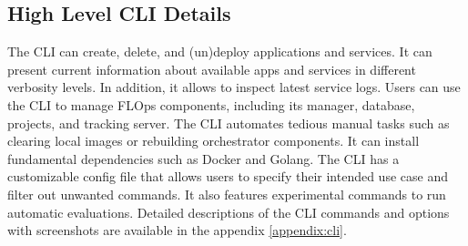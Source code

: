 

\subsection{High Level CLI Details}

The CLI can create, delete, and (un)deploy applications and services.
It can present current information about available apps and services in different verbosity levels.
In addition, it allows to inspect latest service logs.
Users can use the CLI to manage FLOps components, including its manager, database, projects, and tracking server.
The CLI automates tedious manual tasks such as clearing local images or rebuilding orchestrator components.
It can install fundamental dependencies such as Docker and Golang.
The CLI has a customizable config file that allows users to specify their intended use case and filter out unwanted commands.
It also features experimental commands to run automatic evaluations.
Detailed descriptions of the CLI commands and options with screenshots are available in the appendix \ref{appendix:cli}.